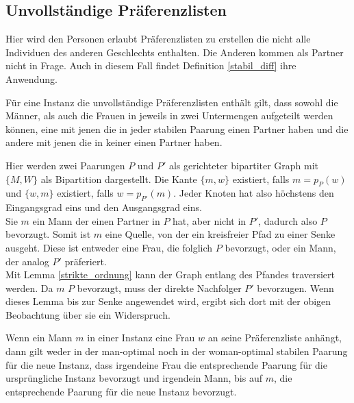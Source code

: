 \subsection{Unvollständige Präferenzlisten}

Hier wird den Personen erlaubt Präferenzlisten zu erstellen die nicht alle Individuen des anderen Geschlechts enthalten. Die Anderen kommen als Partner nicht in Frage. Auch in diesem Fall findet Definition \ref{stabil_diff} ihre Anwendung.

\begin{Theorem}
\label{partner_oder_nicht}
  Für eine Instanz die unvollständige Präferenzlisten enthält gilt, dass sowohl die Männer, als auch die Frauen in jeweils in zwei Untermengen aufgeteilt werden können, eine mit jenen die in jeder stabilen Paarung einen Partner haben und die andere mit jenen die in keiner einen Partner haben.
\end{Theorem}

\begin{Beweis}
\label{partner_oder_nicht_bew}
  Hier werden zwei Paarungen $P$ und $P'$ als gerichteter bipartiter Graph mit $\{M,W\}$ als Bipartition dargestellt. Die Kante $\{m,w\}$ existiert, falls $m = p_{P}(w)$ und $\{w,m\}$ existiert, falls $w = p_{P'}(m)$. Jeder Knoten hat also höchstens den Eingangsgrad eins und den Ausgangsgrad eins.\\
  Sie $m$ ein Mann der einen Partner in $P$ hat, aber nicht in $P'$, dadurch also $P$ bevorzugt. Somit ist $m$ eine Quelle, von der ein kreisfreier Pfad zu einer Senke ausgeht. Diese ist entweder eine Frau, die folglich $P$ bevorzugt, oder ein Mann, der analog $P'$ präferiert.\\
  Mit Lemma \ref{strikte_ordnung} kann der Graph entlang des Pfandes traversiert werden. Da $m$ $P$ bevorzugt, muss der direkte Nachfolger $P'$ bevorzugen. Wenn dieses Lemma bis zur Senke angewendet wird, ergibt sich dort mit der obigen Beobachtung über sie ein Widerspruch.
\end{Beweis}


\begin{Theorem}
\label{element_enfuegen}
  Wenn ein Mann $m$ in einer Instanz eine Frau $w$ an seine Präferenzliste anhängt, dann gilt weder in der man-optimal noch in der woman-optimal stabilen Paarung für die neue Instanz, dass irgendeine Frau die entsprechende Paarung für die ursprüngliche Instanz bevorzugt und irgendein Mann, bis auf $m$, die entsprechende Paarung für die neue Instanz bevorzugt.
\end{Theorem}

